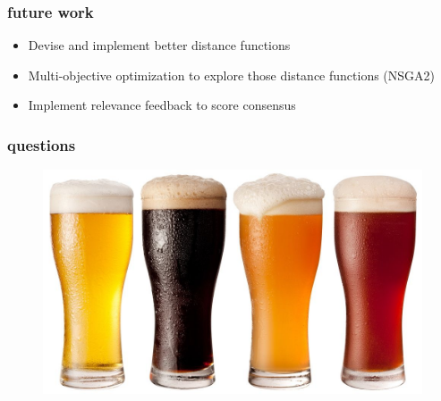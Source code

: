 \documentclass{beamer}
\begin{document}
\begin{frame}
	\frametitle{future work}
	\begin{itemize}
		\item Devise and implement better distance functions
		\item Multi-objective optimization to explore those distance functions (NSGA2)
		\item Implement relevance feedback to score consensus
		\end{itemize}
\end{frame}


\begin{frame}
	\frametitle{questions}
	\begin{figure}
	\centering
	\includegraphics[scale=1]{figs/beer}
	\end{figure}
	
\end{frame}






\end{document}
